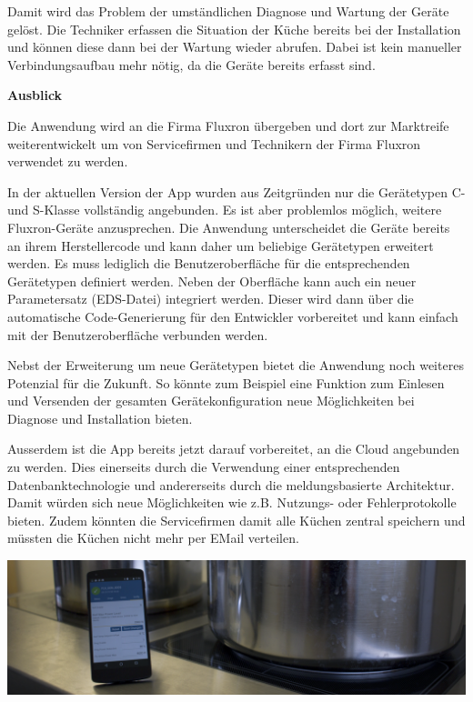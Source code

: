 Damit wird das Problem der umständlichen Diagnose und Wartung der Geräte gelöst. Die Techniker erfassen die Situation der Küche bereits bei der Installation und können diese dann bei der Wartung wieder abrufen. Dabei ist kein manueller Verbindungsaufbau mehr nötig, da die Geräte bereits erfasst sind.

\pagebreak

\textbf{Ausblick}

Die Anwendung wird an die Firma Fluxron übergeben und dort zur Marktreife weiterentwickelt um von Servicefirmen und Technikern der Firma Fluxron verwendet zu werden.

In der aktuellen Version der App wurden aus Zeitgründen nur die Gerätetypen C- und S-Klasse vollständig angebunden. Es ist aber problemlos möglich, weitere Fluxron-Geräte anzusprechen. Die Anwendung unterscheidet die Geräte bereits an ihrem Herstellercode und kann daher um beliebige Gerätetypen erweitert werden. Es muss lediglich die Benutzeroberfläche für die entsprechenden Gerätetypen definiert werden. Neben der Oberfläche kann auch ein neuer Parametersatz (EDS-Datei) integriert werden. Dieser wird dann über die automatische Code-Generierung für den Entwickler vorbereitet und kann einfach mit der Benutzeroberfläche verbunden werden.

Nebst der Erweiterung um neue Gerätetypen bietet die Anwendung noch weiteres Potenzial für die Zukunft. So könnte zum Beispiel eine Funktion zum Einlesen und Versenden der gesamten Gerätekonfiguration neue Möglichkeiten bei Diagnose und Installation bieten.

Ausserdem ist die App bereits jetzt darauf vorbereitet, an die Cloud angebunden zu werden. Dies einerseits durch die Verwendung einer entsprechenden Datenbanktechnologie und andererseits durch die meldungsbasierte Architektur. Damit würden sich neue Möglichkeiten wie z.B. Nutzungs- oder Fehlerprotokolle bieten. Zudem könnten die Servicefirmen damit alle Küchen zentral speichern und müssten die Küchen nicht mehr per EMail verteilen.

\vspace{0.4cm}

\includegraphics[trim={0 0 36 0},clip]{start/img/img_7670}